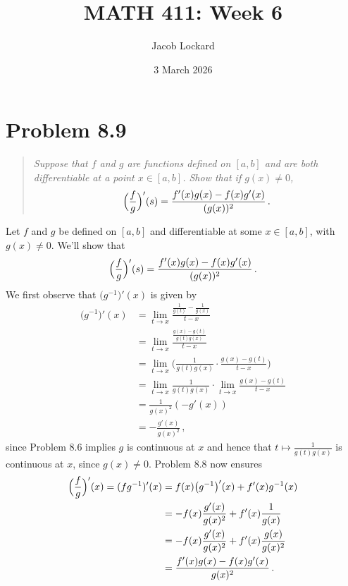 \documentclass{article}
\begin{document}
\title{MATH 411: Week 6}
\author{Jacob Lockard}
\date{3 March 2026}

\maketitle

\section*{Problem 8.9}

\begin{quote}
    \itshape
    Suppose that $f$ and $g$ are functions defined on $[a,b]$ and are both
    differentiable at a point $x \in [a,b]$. Show that if $g(x) \neq 0$,
    \begin{align*}
        \Bigl( \frac{f}{g} \Bigr)' (s) = \frac{ f'(x)g(x) - f(x)g'(x) }{ (g(x))^2} \,.
    \end{align*}
\end{quote}

Let $f$ and $g$ be defined on $[a,b]$ and differentiable at some $x \in [a,b]$,
with $g(x) \neq 0$. We'll show that
\begin{align*}
    \Bigl( \frac{f}{g} \Bigr)' (s) = \frac{ f'(x)g(x) - f(x)g'(x) }{ (g(x))^2} \,.
\end{align*}
We first observe that $\bigl(g^{-1}\bigr)'(x)$ is given by
\begin{align*}
    \bigl(g^{-1}\bigr)'(x) &= \lim_{t\to x} \frac{\frac{1}{g(t)} - \frac{1}{g(x)}}{t-x} \\
    &= \lim_{t\to x} \frac{\frac{g(x) - g(t)}{g(t)g(x)}}{t-x} \\
    &= \lim_{t\to x} \Biggl( \frac{1}{g(t)g(x)} \cdot \frac{g(x) - g(t)}{t-x} \Biggr) \\
    &= \lim_{t\to x} \frac{1}{g(t)g(x)} \cdot \lim_{t\to x} \frac{g(x) - g(t)}{t-x} \\
    &= \frac{1}{g(x)^2}(-g'(x)) \\
    &= -\frac{g'(x)}{g(x)^2} \,,
\end{align*}
since Problem 8.6 implies $g$ is continuous at $x$ and hence that
$t \mapsto \frac{1}{g(t)g(x)}$ is continuous at $x$, since $g(x) \neq 0$.
Problem 8.8 now ensures
\begin{align*}
    \Bigl( \frac{f}{g} \Bigr)'(x) = ( fg^{-1} )'(x) &= 
    f(x)\bigl(g^{-1}\bigr)'(x) + f'(x)g^{-1}(x) \\
    &= -f(x) \frac{g'(x)}{g(x)^2} + f'(x)\frac{1}{g(x)} \\
    &= -f(x) \frac{g'(x)}{g(x)^2} + f'(x)\frac{g(x)}{g(x)^2} \\
    &= \frac{f'(x)g(x) - f(x)g'(x)}{g(x)^2} \,.
\end{align*}
\end{document}

